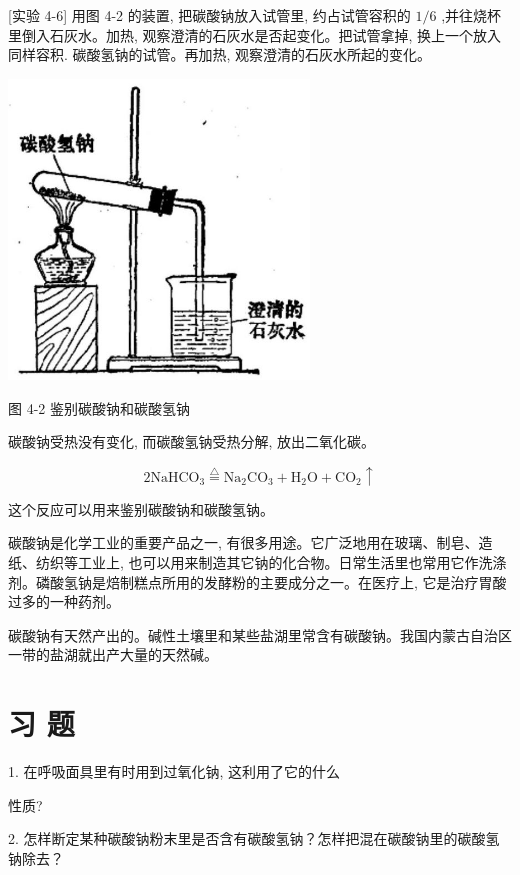\documentclass[10pt]{article}
\begin{document}
[实验 4-6] 用图 4-2 的装置, 把碳酸钠放入试管里, 约占试管容积的 \(1/6\) ,并往烧杯里倒入石灰水。加热, 观察澄清的石灰水是否起变化。把试管拿掉, 换上一个放入同样容积. 碳酸氢钠的试管。再加热, 观察澄清的石灰水所起的变化。

\begin{center}
\includegraphics[max width=0.6\textwidth]{images/01912d0f-097c-7e75-8f32-4f326cd86c9f_93_618569.jpg}
\end{center}

图 4-2 鉴别碳酸钠和碳酸氢钠

碳酸钠受热没有变化, 而碳酸氢钠受热分解, 放出二氧化碳。

\[
2{\mathrm{{NaHCO}}}_{3}\overset{\bigtriangleup }{ = }{\mathrm{{Na}}}_{2}{\mathrm{{CO}}}_{3} + {\mathrm{H}}_{2}\mathrm{O} + {\mathrm{{CO}}}_{2} \uparrow
\]

这个反应可以用来鉴别碳酸钠和碳酸氢钠。

碳酸钠是化学工业的重要产品之一, 有很多用途。它广泛地用在玻璃、制皂、造纸、纺织等工业上, 也可以用来制造其它钠的化合物。日常生活里也常用它作洗涤剂。磷酸氢钠是焙制糕点所用的发酵粉的主要成分之一。在医疗上, 它是治疗胃酸过多的一种药剂。

碳酸钠有天然产出的。碱性土壤里和某些盐湖里常含有碳酸钠。我国内蒙古自治区一带的盐湖就出产大量的天然碱。

\section*{习 题}

1. 在呼吸面具里有时用到过氧化钠, 这利用了它的什么

性质?

2. 怎样断定某种碳酸钠粉末里是否含有碳酸氢钠？怎样把混在碳酸钠里的碳酸氢钠除去？
\end{document}
